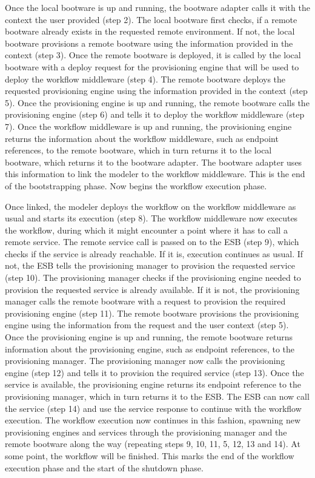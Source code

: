 Once the local bootware is up and running, the bootware adapter calls it with the context the user provided (step 2).
The local bootware first checks, if a remote bootware already exists in the requested remote environment.
If not, the local bootware provisions a remote bootware using the information provided in the context (step 3).
Once the remote bootware is deployed, it is called by the local bootware with a deploy request for the provisioning engine that will be used to deploy the workflow middleware (step 4).
The remote bootware deploys the requested provisioning engine using the information provided in the context (step 5).
Once the provisioning engine is up and running, the remote bootware calls the provisioning engine (step 6) and tells it to deploy the workflow middleware (step 7).
Once the workflow middleware is up and running, the provisioning engine returns the information about the workflow middleware, such as endpoint references, to the remote bootware, which in turn returns it to the local bootware, which returns it to the bootware adapter.
The bootware adapter uses this information to link the modeler to the workflow middleware.
This is the end of the bootstrapping phase.
Now begins the workflow execution phase.

Once linked, the modeler deploys the workflow on the workflow middleware as usual and starts its execution (step 8).
The workflow middleware now executes the workflow, during which it might encounter a point where it has to call a remote service.
The remote service call is passed on to the ESB (step 9), which checks if the service is already reachable.
If it is, execution continues as usual.
If not, the ESB tells the provisioning manager to provision the requested service (step 10).
The provisioning manager checks if the provisioning engine needed to provision the requested service is already available.
If it is not, the provisioning manager calls the remote bootware with a request to provision the required provisioning engine (step 11).
The remote bootware provisions the provisioning engine using the information from the request and the user context (step 5).
Once the provisioning engine is up and running, the remote bootware returns information about the provisioning engine, such as endpoint references, to the provisioning manager.
The provisioning manager now calls the provisioning engine (step 12) and tells it to provision the required service (step 13).
Once the service is available, the provisioning engine returns its endpoint reference to the provisioning manager, which in turn returns it to the ESB.
The ESB can now call the service (step 14) and use the service response to continue with the workflow execution.
The workflow execution now continues in this fashion, spawning new provisioning engines and services through the provisioning manager and the remote bootware along the way (repeating steps 9, 10, 11, 5, 12, 13 and 14).
At some point, the workflow will be finished.
This marks the end of the workflow execution phase and the start of the shutdown phase.

